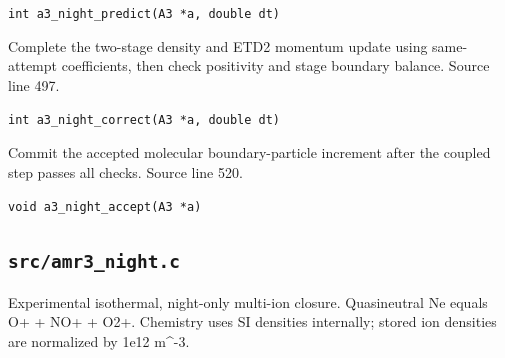 \begin{description}[style=nextline,leftmargin=0pt,labelindent=0pt,labelwidth=0pt,labelsep=0pt]
{\small\nolinkurl{int a3_night_predict(A3 *a, double dt)}}
\item[\texttt{a3\_night\_correct}] Complete the two-stage density and ETD2 momentum update using same-attempt coefficients, then check positivity and stage boundary balance. Source line 497.\par
{\small\nolinkurl{int a3_night_correct(A3 *a, double dt)}}
\item[\texttt{a3\_night\_accept}] Commit the accepted molecular boundary-particle increment after the coupled step passes all checks. Source line 520.\par
{\small\nolinkurl{void a3_night_accept(A3 *a)}}
\end{description}
\subsection{\texttt{src/amr3\_night.c}}
Experimental isothermal, night-only multi-ion closure. Quasineutral Ne equals O+ + NO+ + O2+. Chemistry uses SI densities internally; stored ion densities are normalized by 1e12 m\textasciicircum{}-3.
